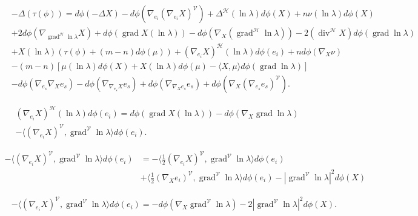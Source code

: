 \documentclass[12pt]{article}
\begin{document}
\begin{align*}
&-\Delta (\tau(\phi))
= d\phi(-\Delta X) - d\phi(\nabla_{e_{i}}(\nabla_{e_{i}}X)^{\mathcal{V}}) + \Delta^{\mathcal{H}} (\ln\lambda) d\phi(X) + n\nu(\ln\lambda) d\phi(X) \\
& + 2 d\phi(\nabla_{\operatorname{grad}^{\mathcal{H}} \ln\lambda} X) + d\phi(\operatorname{grad} X(\ln\lambda)) -d\phi(\nabla_{X} (\operatorname{grad}^{\mathcal{H}}\ln\lambda)) -2 (\operatorname{div}^{\mathcal{H}} X) d\phi(\operatorname{grad} \ln\lambda) \\
& + X(\ln \lambda)(\tau(\phi) + (m-n) d\phi(\mu) )
+ (\nabla_{e_{i}}X)^{\mathcal{H}} (\ln\lambda)d\phi(e_{i})  + n d\phi(\nabla_{X} \nu) \\
& - (m-n)[ \mu(\ln\lambda) d\phi(X) + X(\ln\lambda) d\phi(\mu) - \langle X, \mu \rangle d\phi(\operatorname{grad}\ln\lambda)] \\
& - d\phi(\nabla_{e_{s}}\nabla_{X} e_{s}) - d\phi(\nabla_{\nabla_{e_{s}}X}e_{s}) +
d\phi(\nabla_{\nabla_{X}e_{s}}e_{s})+ d\phi (\nabla_{X}(\nabla_{e_{s}}e_{s})^{\mathcal{V}} ).
\end{align*}

\begin{align*}
&(\nabla_{e_{i}}X)^{\mathcal{H}} (\ln\lambda)d\phi(e_{i}) 
= d\phi( \operatorname{grad}  X (\ln\lambda ) ) - d\phi(\nabla_{X} \operatorname{grad} \ln\lambda)\\
& - \langle (\nabla_{e_{i}}X)^{\mathcal{V}} ,  \operatorname{grad}^{\mathcal{V}} \ln\lambda \rangle d\phi(e_{i}).
\end{align*}

\begin{align*}
- \langle (\nabla_{e_{i}}X)^{\mathcal{V}} ,  \operatorname{grad}^{\mathcal{V}} \ln\lambda \rangle d\phi(e_{i}) &=
 - \langle \tfrac{1}{2} (\nabla_{e_{i}}X)^{\mathcal{V}} ,  \operatorname{grad}^{\mathcal{V}} \ln\lambda \rangle d\phi(e_{i}) \\
&+ \langle \tfrac{1}{2} (\nabla_{X}e_{i})^{\mathcal{V}} ,  \operatorname{grad}^{\mathcal{V}} \ln\lambda \rangle d\phi(e_{i})
- |\operatorname{grad}^{\mathcal{V}} \ln\lambda|^2 d\phi(X)
\end{align*}

\begin{align*}
&- \langle (\nabla_{e_{i}}X)^{\mathcal{V}} ,  \operatorname{grad}^{\mathcal{V}} \ln\lambda \rangle d\phi(e_{i}) = - d\phi(\nabla_{X}\operatorname{grad}^{\mathcal{V}} \ln\lambda) - 2|\operatorname{grad}^{\mathcal{V}} \ln\lambda|^2 d\phi(X).
\end{align*}
\end{document}
